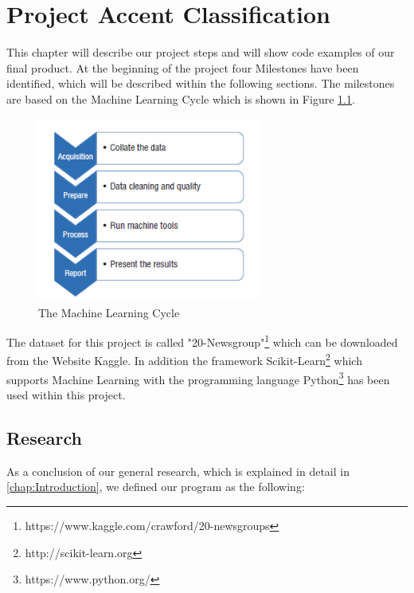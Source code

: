 \documentclass[notitlepage,english]{hgbreport}
\begin{document}
\chapter{Project Accent Classification}
\label{chap:accentClassification}

This chapter will describe our project steps and will show code examples of our final product. At the beginning of the project four Milestones have been identified, which will be described within the following sections. The milestones are based on the Machine Learning Cycle which is shown in Figure \ref{fig:learningCycle}.

\begin{figure}[ht]
	\centering
	\includegraphics[width=0.65\textwidth]{images/learningCycle}
	\caption{The Machine Learning Cycle \cite{bell2014machine}}
\label{fig:learningCycle}
\end{figure}
\noindent The dataset for this project is called "20-Newsgroup"\footnote{https://www.kaggle.com/crawford/20-newsgroups} which can be downloaded from the Website Kaggle. In addition the framework Scikit-Learn\footnote{http://scikit-learn.org} which supports Machine Learning with the programming language Python\footnote{https://www.python.org/} has been used within this project.

\section{Research}

As a conclusion of our general research, which is explained in detail in \ref{chap:Introduction}, we defined our program as the following: 
\end{document}
